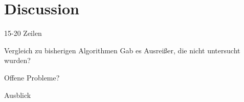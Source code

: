 \section{Discussion}
\label{sec:discussion}

15-20 Zeilen

Vergleich zu bisherigen Algorithmen
Gab es Ausreißer, die nicht untersucht wurden?

Offene Probleme?

Ausblick
